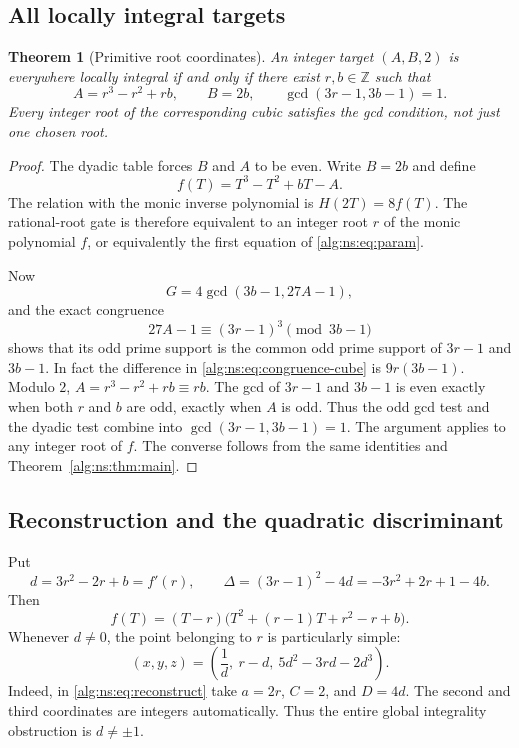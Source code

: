 \documentclass[11pt]{article}
\numberwithin{equation}{section}
\newtheorem{theorem}{Theorem}[section]
\theoremstyle{plain}
\theoremstyle{plain}
\theoremstyle{plain}
\theoremstyle{definition}
\theoremstyle{definition}
\theoremstyle{definition}
\theoremstyle{remark}
\newcommand{\Z}{\mathbb Z}\newcommand{\Q}{\mathbb Q}
\begin{document}
\subsection{All locally integral targets}
\begin{theorem}[Primitive root coordinates]\label{alg:ns:thm:param}
An integer target $(A,B,2)$ is everywhere locally integral if and only if
there exist $r,b\in\Z$ such that
\begin{equation}\label{alg:ns:eq:param}
A=r^3-r^2+rb,\qquad B=2b,\qquad
\gcd(3r-1,3b-1)=1.
\end{equation}
Every integer root of the corresponding cubic satisfies the gcd
condition, not just one chosen root.
\end{theorem}
\begin{proof}
The dyadic table forces $B$ and $A$ to be even. Write $B=2b$ and define
\begin{equation}\label{alg:ns:eq:f}
f(T)=T^3-T^2+bT-A.
\end{equation}
The relation with the monic inverse polynomial is $H(2T)=8f(T)$.
The rational-root gate is therefore equivalent to an integer root $r$
of the monic polynomial $f$, or equivalently the first equation of
\eqref{alg:ns:eq:param}.

Now
\[
G=4\gcd(3b-1,27A-1),
\]
and the exact congruence
\begin{equation}\label{alg:ns:eq:congruence-cube}
27A-1\equiv(3r-1)^3\pmod{3b-1}
\end{equation}
shows that its odd prime support is the common odd prime support of
$3r-1$ and $3b-1$. In fact the difference in
\eqref{alg:ns:eq:congruence-cube} is $9r(3b-1)$.
Modulo $2$, $A=r^3-r^2+rb\equiv rb$. The gcd of $3r-1$ and $3b-1$
is even exactly when both $r$ and $b$ are odd, exactly when $A$ is odd.
Thus the odd gcd test and the dyadic test combine into
$\gcd(3r-1,3b-1)=1$. The argument applies to any integer root of $f$.
The converse follows from the same identities and
Theorem~\ref{alg:ns:thm:main}.
\end{proof}

\subsection{Reconstruction and the quadratic discriminant}
Put
\begin{equation}\label{alg:ns:eq:dDelta}
d=3r^2-2r+b=f'(r),\qquad
\Delta=(3r-1)^2-4d=-3r^2+2r+1-4b.
\end{equation}
Then
\begin{equation}\label{alg:ns:eq:factor-f}
f(T)=(T-r)\bigl(T^2+(r-1)T+r^2-r+b\bigr).
\end{equation}
Whenever $d\ne0$, the point belonging to $r$ is particularly simple:
\begin{equation}\label{alg:ns:eq:slice-inverse}
\boxed{\quad
(x,y,z)=\left(\frac1d,\ r-d,\ 5d^2-3rd-2d^3\right).
\quad}
\end{equation}
Indeed, in \eqref{alg:ns:eq:reconstruct} take $a=2r$, $C=2$, and $D=4d$.
The second and third coordinates are integers automatically. Thus the
entire global integrality obstruction is $d\ne\pm1$.
\end{document}
